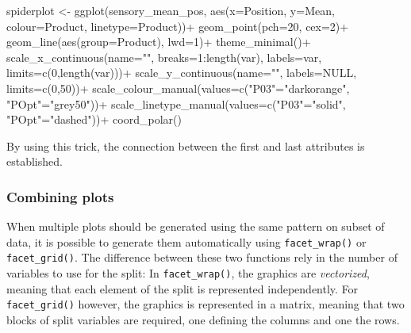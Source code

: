 \documentclass[
]{book}
\newenvironment{Shaded}{\begin{snugshade}}{\end{snugshade}}
\newcommand{\AttributeTok}[1]{\textcolor[rgb]{0.77,0.63,0.00}{#1}}
\newcommand{\ConstantTok}[1]{\textcolor[rgb]{0.00,0.00,0.00}{#1}}
\newcommand{\DecValTok}[1]{\textcolor[rgb]{0.00,0.00,0.81}{#1}}
\newcommand{\FunctionTok}[1]{\textcolor[rgb]{0.00,0.00,0.00}{#1}}
\newcommand{\NormalTok}[1]{#1}
\newcommand{\OtherTok}[1]{\textcolor[rgb]{0.56,0.35,0.01}{#1}}
\newcommand{\SpecialCharTok}[1]{\textcolor[rgb]{0.00,0.00,0.00}{#1}}
\newcommand{\StringTok}[1]{\textcolor[rgb]{0.31,0.60,0.02}{#1}}
\begin{document}
\begin{Shaded}
\begin{Highlighting}[]
\NormalTok{spiderplot }\OtherTok{\textless{}{-}} \FunctionTok{ggplot}\NormalTok{(sensory\_mean\_pos, }\FunctionTok{aes}\NormalTok{(}\AttributeTok{x=}\NormalTok{Position, }\AttributeTok{y=}\NormalTok{Mean, }\AttributeTok{colour=}\NormalTok{Product, }\AttributeTok{linetype=}\NormalTok{Product))}\SpecialCharTok{+}
  \FunctionTok{geom\_point}\NormalTok{(}\AttributeTok{pch=}\DecValTok{20}\NormalTok{, }\AttributeTok{cex=}\DecValTok{2}\NormalTok{)}\SpecialCharTok{+}
  \FunctionTok{geom\_line}\NormalTok{(}\FunctionTok{aes}\NormalTok{(}\AttributeTok{group=}\NormalTok{Product), }\AttributeTok{lwd=}\DecValTok{1}\NormalTok{)}\SpecialCharTok{+}
  \FunctionTok{theme\_minimal}\NormalTok{()}\SpecialCharTok{+}
  \FunctionTok{scale\_x\_continuous}\NormalTok{(}\AttributeTok{name=}\StringTok{""}\NormalTok{, }\AttributeTok{breaks=}\DecValTok{1}\SpecialCharTok{:}\FunctionTok{length}\NormalTok{(var), }\AttributeTok{labels=}\NormalTok{var, }\AttributeTok{limits=}\FunctionTok{c}\NormalTok{(}\DecValTok{0}\NormalTok{,}\FunctionTok{length}\NormalTok{(var)))}\SpecialCharTok{+}
  \FunctionTok{scale\_y\_continuous}\NormalTok{(}\AttributeTok{name=}\StringTok{""}\NormalTok{, }\AttributeTok{labels=}\ConstantTok{NULL}\NormalTok{, }\AttributeTok{limits=}\FunctionTok{c}\NormalTok{(}\DecValTok{0}\NormalTok{,}\DecValTok{50}\NormalTok{))}\SpecialCharTok{+}
  \FunctionTok{scale\_colour\_manual}\NormalTok{(}\AttributeTok{values=}\FunctionTok{c}\NormalTok{(}\StringTok{"P03"}\OtherTok{=}\StringTok{"darkorange"}\NormalTok{, }\StringTok{"POpt"}\OtherTok{=}\StringTok{"grey50"}\NormalTok{))}\SpecialCharTok{+}
  \FunctionTok{scale\_linetype\_manual}\NormalTok{(}\AttributeTok{values=}\FunctionTok{c}\NormalTok{(}\StringTok{"P03"}\OtherTok{=}\StringTok{"solid"}\NormalTok{, }\StringTok{"POpt"}\OtherTok{=}\StringTok{"dashed"}\NormalTok{))}\SpecialCharTok{+}
  \FunctionTok{coord\_polar}\NormalTok{()}
\end{Highlighting}
\end{Shaded}

By using this trick, the connection between the first and last attributes is established.

\hypertarget{combining-plots}{%
\subsubsection{Combining plots}\label{combining-plots}}

When multiple plots should be generated using the same pattern on subset of data, it is possible to generate them automatically using \texttt{facet\_wrap()} or \texttt{facet\_grid()}.
The difference between these two functions rely in the number of variables to use for the split: In \texttt{facet\_wrap()}, the graphics are \emph{vectorized}, meaning that each element of the split is represented independently. For \texttt{facet\_grid()} however, the graphics is represented in a matrix, meaning that two blocks of split variables are required, one defining the columns and one the rows.
\end{document}
